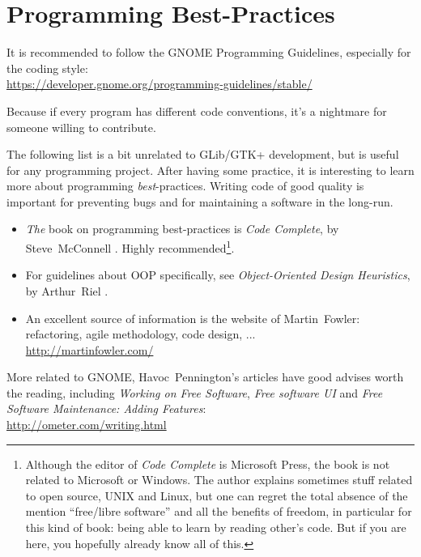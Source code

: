 \section{Programming Best-Practices}

It is recommended to follow the GNOME Programming Guidelines, especially for the coding style:\\
\url{https://developer.gnome.org/programming-guidelines/stable/}

Because if every program has different code conventions, it's a nightmare for someone willing to contribute.

The following list is a bit unrelated to GLib/GTK+ development, but is useful for any programming project. After having some practice, it is interesting to learn more about programming \emph{best}-practices. Writing code of good quality is important for preventing bugs and for maintaining a software in the long-run.

\begin{itemize}
  \item \emph{The} book on programming best-practices is \emph{Code Complete}, by Steve~McConnell \cite{code-complete}. Highly recommended\footnote{Although the editor of \emph{Code Complete} is Microsoft Press, the book is not related to Microsoft or Windows. The author explains sometimes stuff related to open source, UNIX and Linux, but one can regret the total absence of the mention ``free/libre software'' and all the benefits of freedom, in particular for this kind of book: being able to learn by reading other's code. But if you are here, you hopefully already know all of this.}.

  \item For guidelines about OOP specifically, see \emph{Object-Oriented Design Heuristics}, by Arthur~Riel \cite{oop-book}.

  \item An excellent source of information is the website of Martin~Fowler: refactoring, agile methodology, code design, ...\\
  \url{http://martinfowler.com/}
\end{itemize}

More related to GNOME, Havoc~Pennington's articles have good advises worth the reading, including \emph{Working on Free Software}, \emph{Free software UI} and \emph{Free Software Maintenance: Adding Features}:\\
\url{http://ometer.com/writing.html}
